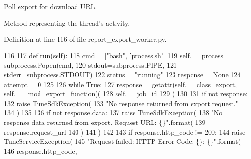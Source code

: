 Poll export for download U\-R\-L. 

Method representing the thread's activity. 

Definition at line 116 of file report\-\_\-export\-\_\-worker.\-py.


\begin{DoxyCode}
116 
117     \textcolor{keyword}{def }\hyperlink{classtune_1_1management_1_1reports_1_1report__export__worker_1_1ReportExportWorker_a44d3b02f06bbe340a4311e84a28055ac}{run}(self):
118         cmd = [\textcolor{stringliteral}{"bash"}, \textcolor{stringliteral}{'process.sh'}]
119         self.\hyperlink{classtune_1_1management_1_1reports_1_1report__export__worker_1_1ReportExportWorker_afbdedb366ee3e00378979a90bac67bb8}{\_\_process} = subprocess.Popen(cmd,
120                      stdout=subprocess.PIPE,
121                      stderr=subprocess.STDOUT)
122         status = \textcolor{stringliteral}{"running"}
123         response = \textcolor{keywordtype}{None}
124         attempt = 0
125 
126         \textcolor{keywordflow}{while} \textcolor{keyword}{True}:
127             response = getattr(self.\hyperlink{classtune_1_1management_1_1reports_1_1report__export__worker_1_1ReportExportWorker_a398025eb4319898a002a2996e9e12e55}{\_\_class\_export}, self.
      \hyperlink{classtune_1_1management_1_1reports_1_1report__export__worker_1_1ReportExportWorker_a817a81e441f511cd5464c5e9358d4d59}{\_\_mod\_export\_function})(
128                     self.\hyperlink{classtune_1_1management_1_1reports_1_1report__export__worker_1_1ReportExportWorker_a5360619387f156dd92ebf971b5353047}{\_\_job\_id}
129                 )
130 
131             \textcolor{keywordflow}{if} \textcolor{keywordflow}{not} response:
132                 \textcolor{keywordflow}{raise} TuneSdkException(
133                     \textcolor{stringliteral}{"No response returned from export request."}
134                 )
135 
136             \textcolor{keywordflow}{if} \textcolor{keywordflow}{not} response.data:
137                 \textcolor{keywordflow}{raise} TuneSdkException(
138                     \textcolor{stringliteral}{"No response data returned from export. Request URL: \{\}"}.format(
139                         response.request\_url
140                     )
141                 )
142 
143             \textcolor{keywordflow}{if} response.http\_code != 200:
144                 \textcolor{keywordflow}{raise} TuneServiceException(
145                     \textcolor{stringliteral}{"Request failed: HTTP Error Code: \{\}: \{\}"}.format(
146                         response.http\_code,

\end{DoxyCode}
